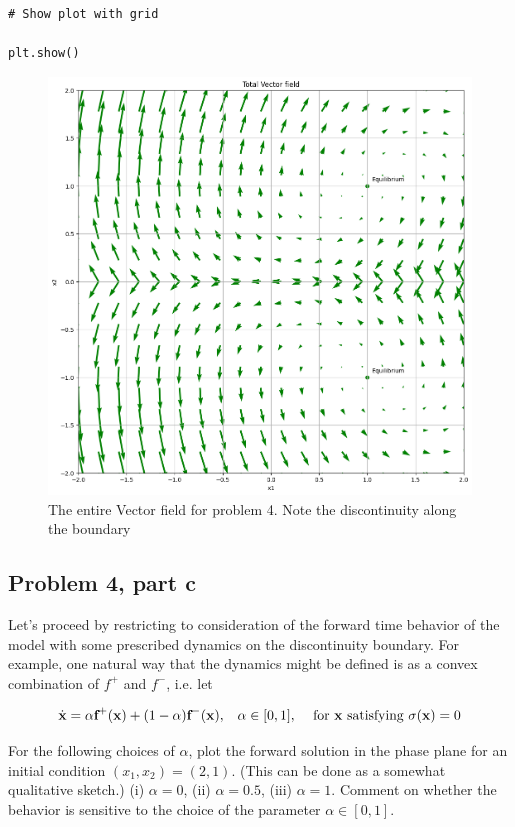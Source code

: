 \begin{solution}
\begin{lstlisting}
# Show plot with grid 
 
plt.show() 
\end{lstlisting}


\jump
\begin{figure}[!ht]
\centering
\includegraphics[scale = 0.6]{Images/vector field for system.png}
\caption{The entire Vector field for problem 4. Note the discontinuity along the boundary}
\label{png:vectorfield}
\end{figure}
\end{solution}

\vspace{\floatsep}
\clearpage

\subsection{Problem 4, part c}

Let’s proceed by restricting to consideration of the forward time behavior of the model with some prescribed dynamics on the discontinuity boundary. For example, one natural way that the dynamics might be defined is as a convex combination of $f^+$ and $f^-$, i.e. let

\[
\dot{\textbf{x}} = \alpha\textbf{f}^+(\textbf{x}) + (1 - \alpha)\textbf{f}^-(\textbf{x}), \hspace{3mm} \alpha \in [0, 1], \hspace{3mm} \text{ for \textbf{x} satisfying $\sigma(\textbf{x}) = 0$}
\]

For the following choices of $\alpha$, plot the forward solution in the phase plane for an initial condition $(x_1, x_2) = (2, 1)$. (This can be done as a somewhat qualitative sketch.) (i) $\alpha = 0$, (ii) $\alpha = 0.5$, (iii) $\alpha = 1$. Comment on whether the behavior is sensitive to the choice of the parameter $\alpha \in [0, 1]$.

